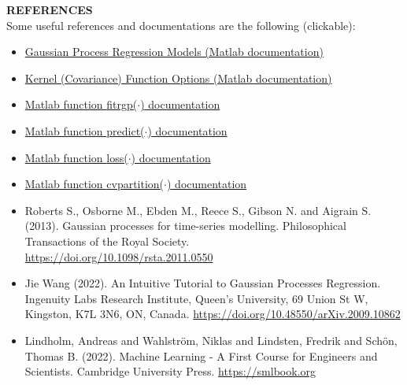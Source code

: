 \documentclass[12pt,a4paper]{article}
\newcommand{\boldmark}[1]{\noindent\textbf{#1}\\ }
\begin{document}


\vspace{2cm}

\sectionmark{}
\noindent
\boldmark{\Large{{\color{crimsonglory}REFERENCES}}}

\normalsize
\noindent
Some useful references and documentations are the following (clickable):
\begin{itemize}
    \item \href{https://www.mathworks.com/help/stats/gaussian-process-regression-models.html}{Gaussian Process Regression Models (Matlab documentation)}
    \item \href{https://www.mathworks.com/help/stats/kernel-covariance-function-options.html}{Kernel (Covariance) Function Options (Matlab documentation)}
    \item \href{https://www.mathworks.com/help/stats/fitrgp.html}{Matlab function {\color{blue}fitrgp($\cdot$)} documentation}
    \item \href{https://www.mathworks.com/help/stats/compactregressiongp.predict.html}{Matlab function {\color{blue}predict($\cdot$)} documentation}
    \item \href{https://www.mathworks.com/help/stats/compactregressiongp.loss.html}{Matlab function {\color{blue}loss($\cdot$)} documentation}
    \item \href{https://www.mathworks.com/help/stats/cvpartition.html}{Matlab function {\color{blue}cvpartition($\cdot$)} documentation}
    \item Roberts S., Osborne M., Ebden M., Reece S., Gibson N. and Aigrain S. (2013). Gaussian processes for time-series modelling. Philosophical Transactions of the Royal Society.\\ \url{https://doi.org/10.1098/rsta.2011.0550}
    \item Jie Wang (2022). An Intuitive Tutorial to Gaussian Processes Regression. Ingenuity Labs Research Institute, Queen’s University, 69 Union St W, Kingston, K7L 3N6, ON, Canada. \url{
https://doi.org/10.48550/arXiv.2009.10862}
    \item Lindholm, Andreas and Wahlstr\"om, Niklas and Lindsten, Fredrik and Sch\"on, Thomas B. (2022). Machine Learning - A First Course for Engineers and Scientists. Cambridge University Press. \url{https://smlbook.org}
\end{itemize}


\vspace{2cm}
\end{document}
